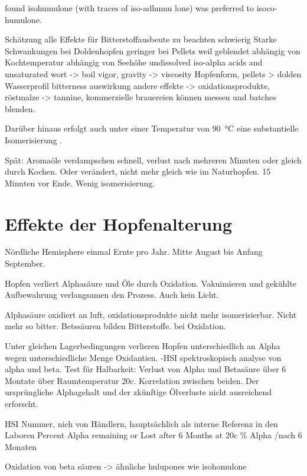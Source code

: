 \documentclass[a4paper,parskip=half]{scrartcl}
\begin{document}
found isohumulone (with traces of
iso-adhumu lone) was preferred to isoco-
humulone.

\parencite[58]{Hall1997}
Schätzung alle Effekte für Bitterstoffausbeute zu beachten schwierig
Starke Schwankungen bei Doldenhopfen
geringer bei Pellets weil geblendet
abhängig von Kochtemperatur abhängig von Seehöhe
undissolved iso-alpha acids and unsaturated wort -> boil vigor, gravity -> viscosity
Hopfenform, pellets > dolden
Wasserprofil bitterness auswirkung
andere effekte -> oxidationsprodukte, röstmalze -> tannine, 
kommerzielle brauereien können messen und batches blenden.


 Darüber hinaus erfolgt auch unter einer Temperatur von 90~°C eine substantielle Isomerisierung \parencite[29]{Malowicki2005}.

\parencite[15]{Garetz1994}
Spät: Aromaöle verdampschen schnell, verlust nach mehreren Minuten
oder gleich durch Kochen. Oder verändert, nicht mehr gleich
wie im Naturhopfen. 15 Minuten vor Ende. Wenig isomerisierung.

\section*{Effekte der Hopfenalterung}

Nördliche Hemisphere einmal Ernte pro Jahr. Mitte August bis
Anfang September.
\parencite[97]{Garetz1994}

\parencite[97]{Garetz1994} Hopfen verliert Alphasäure und Öle
durch Oxidation. Vakuimieren und gekühlte Aufbewahrung verlangsamen
den Prozess. Auch kein Licht. 

\parencite[103]{Garetz1994} Alphasäure oxidiert an luft, oxidationsprodukte
nicht mehr isomerisierbar. Nicht mehr so bitter. Betssäuren bilden
Bitterstoffe. bei Oxidation.

\parencite[104]{Garetz1994} 
Unter gleichen Lagerbedingungen verlieren Hopfen unterschiedlich an
Alpha wegen unterschiedliche Menge Oxidantien.
-HSI spektroskopisch analyse von alpha und beta. Test für Halbarkeit:
Verlust von Alpha und Betasäure über 6 Montate über Raumtemperatur 20c.
Korrelation zwischen beiden. Der ursprüngliche Alphagehalt und der
zkünftige
Ölverluste nicht ausreichend erforscht.

\parencite[104]{Garetz1994} 
HSI Nummer, nich von Händlern, hauptsächlich als interne Referenz
in den Laboren
Percent Alpha remaining or Lost after 6 Months at 20c
\% Alpha /nach 6 Monaten



\parencite[52]{Davidson1997}
Oxidation von beta säuren -> ähnliche hulupones wie isohomulone
\end{document}
